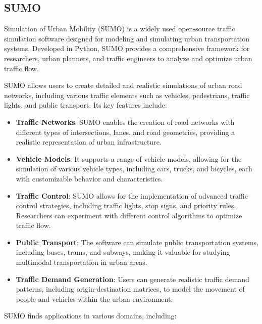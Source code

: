 \subsection{SUMO}
Simulation of Urban Mobility (SUMO)\cite{SUMO2018} is a widely used open-source traffic simulation software designed for modeling and simulating urban transportation systems. Developed in Python, SUMO provides a comprehensive framework for researchers, urban planners, and traffic engineers to analyze and optimize urban traffic flow.

SUMO allows users to create detailed and realistic simulations of urban road networks, including various traffic elements such as vehicles, pedestrians, traffic lights, and public transport. Its key features include:

\begin{itemize}
    \item \textbf{Traffic Networks}: SUMO enables the creation of road networks with different types of intersections, lanes, and road geometries, providing a realistic representation of urban infrastructure.
    
    \item \textbf{Vehicle Models}: It supports a range of vehicle models, allowing for the simulation of various vehicle types, including cars, trucks, and bicycles, each with customizable behavior and characteristics.
    
    \item \textbf{Traffic Control}: SUMO allows for the implementation of advanced traffic control strategies, including traffic lights, stop signs, and priority rules. Researchers can experiment with different control algorithms to optimize traffic flow.
    
    \item \textbf{Public Transport}: The software can simulate public transportation systems, including buses, trams, and subways, making it valuable for studying multimodal transportation in urban areas.
    
    \item\textbf{Traffic Demand Generation}: Users can generate realistic traffic demand patterns, including origin-destination matrices, to model the movement of people and vehicles within the urban environment.
\end{itemize}


SUMO finds applications in various domains, including:

